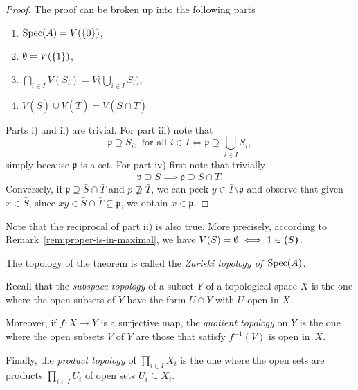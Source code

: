 \begin{proof} The proof can be broken up into the following parts
    \begin{enumerate}[\rm i)]
        \item $\operatorname{Spec}(A)=V(\{0\})$,
        \item $\emptyset=V(\{1\})$,
        \item $\bigcap_{i\in I}V(S_i)=V\big(\bigcup_{i\in I}S_i\big)$,
        \item $V(\bar S)\cup V(\bar T)=V(\bar S\cap\bar T)$
    \end{enumerate}
    Parts i) and ii) are trivial. For part iii) note that 
    $$
        \mathfrak p\supseteq S_i,\text{ for all }i\in I
            \iff \mathfrak p\supseteq\bigcup_{i\in I}S_i,
    $$
    simply because $\mathfrak p$ is a set. For part iv) first note that trivially
    $$
        \mathfrak p\supseteq\bar S
            \implies \mathfrak p\supseteq\bar S\cap\bar T.
    $$
    Conversely, if $\mathfrak p\supseteq \bar S\cap\bar T$ and $p\not\supseteq\bar T$, we can peek $y\in\bar T\setminus\mathfrak p$ and observe that given $x\in\bar S$, since $xy\in\bar S\cap\bar T\subseteq\mathfrak p$, we obtain $x\in\mathfrak p$. 
\end{proof}

\begin{rem}\label{rem:closed-empty-has-1}
    Note that the reciprocal of part ii) is also true. More precisely, according to Remark~\ref{rem:proper-is-in-maximal}, we have $V(S)=\emptyset\iff 1\in\textrm{\boldmath$($}S\textrm{\boldmath$)$}$.
\end{rem}

\begin{defn}
    The topology of the theorem is called the \textsl{Zariski topology of\/}~$\operatorname{Spec}(A)$.
\end{defn}

\begin{rem}
    Recall that the \textsl{subspace topology} of a subset $Y$ of a topological space $X$ is the one where the open subsets of $Y$ have the form $U\cap Y$ with $U$ open in $X$.

    Moreover, if $f\colon X\to Y$ is a surjective map, the \textsl{quotient topology} on $Y$ is the one where the open subsets $V$ of $Y$ are those that satisfy $f^{-1}(V)$ is open in~$X$.

    Finally, the \textsl{product topology} of $\prod_{i\in I}X_i$ is the one where the open sets are products $\prod_{i\in I}U_i$ of open sets $U_i\subseteq X_i$.
\end{rem}

